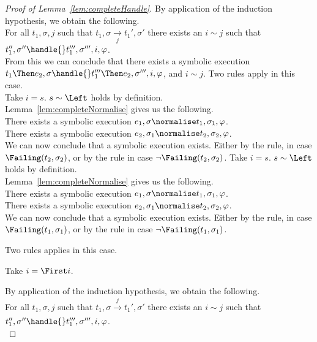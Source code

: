 \begin{proof}[Proof of Lemma~\ref{lem:completeHandle}]
{  By application of the induction hypothesis, we obtain the following.\\
  For all $t_1,\sigma,j$ such that $t_1,\sigma\xrightarrow[j]{}t_1',\sigma'$ there exists an $i\sim j$ such that $t_1'',\sigma''\handle{}t_1''',\sigma''',i,\phi$.\\
  From this we can conclude that there exists a symbolic execution $t_1\Then e_2,\sigma\handle{} t_1'''\Then e_2,\sigma''',i,\phi$, and $i\sim j$.
  }
  {
  Two rules apply in this case.\\
    {
      Take $i=s$. $s\sim \Left$ holds by definition.\\
      Lemma~\ref{lem:completeNormalise} gives us the following.\\
      There exists a symbolic execution $e_1,\sigma\normalise t_1,\sigma_1,\phi$.\\
      There exists a symbolic execution $e_2,\sigma_1\normalise t_2,\sigma_2,\phi$.\\

      We can now conclude that a symbolic execution exists.
      Either by the  rule, in case $\Failing(t_2,\sigma_2)$, or by the  rule in case $\neg\Failing(t_2,\sigma_2)$.
    }
    {
    Take $i=s$. $s\sim \Left$ holds by definition.\\
    Lemma~\ref{lem:completeNormalise} gives us the following.\\
    There exists a symbolic execution $e_1,\sigma\normalise t_1,\sigma_1,\phi$.\\
    There exists a symbolic execution $e_2,\sigma_1\normalise t_2,\sigma_2,\phi$.\\

    We can now conclude that a symbolic execution exists.
    Either by the  rule, in case $\Failing(t_1,\sigma_1)$, or by the  rule in case $\neg\Failing(t_1,\sigma_1)$.
    }
  }
    {
    Two rules applies in this case.\\
    {
    Take $i=\First i$.

    By application of the induction hypothesis, we obtain the following.\\
    For all $t_1,\sigma,j$ such that $t_1,\sigma\xrightarrow[]{j}t_1',\sigma'$ there exists an $i\sim j$ such that $t_1'',\sigma''\handle{}t_1''',\sigma''',i,\phi$.\\

}}
\end{proof}
